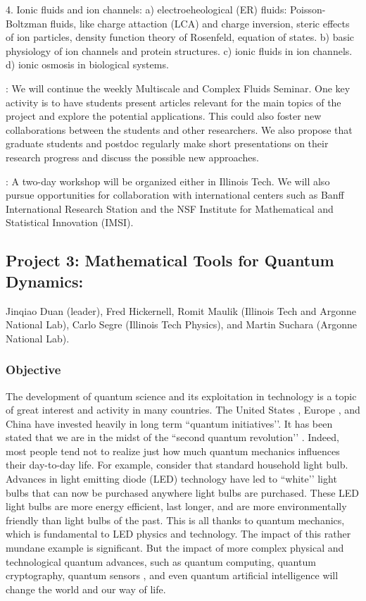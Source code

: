 \documentclass[11pt]{NSFamsart}
\begin{document}
4. Ionic fluids and ion channels: 
     a) electroeheological (ER) fluids: Poisson-Boltzman fluids, like charge attaction (LCA) and charge inversion, 
         steric effects of ion particles, density function theory of Rosenfeld, equation of states. 
     b) basic physiology of ion channels and protein structures. 
     c) ionic fluids in ion channels. 
     d) ionic osmosis in biological systems. 

: {We will continue the weekly Multiscale and Complex Fluids Seminar. One key activity is to have students present articles relevant for the main topics of the project and explore the potential applications. This could also foster new collaborations between the students and other researchers. We also propose that graduate students and postdoc regularly make short presentations on their research progress and discuss the possible new approaches.}

:  A two-day workshop will be organized either in Illinois Tech. We will also pursue opportunities for collaboration with international centers such as Banff International Research Station and the NSF Institute for Mathematical and Statistical Innovation (IMSI).
\fi




\subsection*{Project 3: Mathematical Tools for Quantum Dynamics:}
Jinqiao Duan (leader), Fred Hickernell, Romit Maulik (Illinois Tech and Argonne National Lab), Carlo Segre (Illinois Tech Physics), and Martin Suchara (Argonne National Lab).
\medskip

\subsubsection*{Objective} The development of quantum science and its exploitation in technology is a topic of great interest and activity in many countries. The United States \cite{raymer2019us}, Europe \cite{riedel2019europe}, and China \cite{kania2018quantum} have invested heavily in long term ``quantum initiatives’’.  It has been stated that we are in the midst of the ``second quantum revolution’’ \cite{kania2018quantum}. Indeed,  most people tend not to realize just how much quantum mechanics influences their day-to-day life. For example, consider that standard household light bulb. Advances in light emitting diode (LED) technology have led to ``white’’ light bulbs that can now be purchased anywhere light bulbs are purchased. These LED light bulbs are more energy efficient, last longer, and are more environmentally friendly than light bulbs of the past. This is all thanks to quantum mechanics, which is fundamental to LED physics and technology. The impact of this rather mundane example is significant. But the impact of more complex physical and technological quantum advances, such as quantum computing, quantum cryptography, quantum sensors \cite{ng2020guest}, and even quantum artificial intelligence \cite{taylor2020quantum} will change the world and our way of life.
\end{document}
